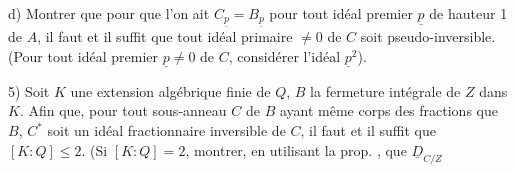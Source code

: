 d) Montrer que pour que l'on ait $C_{\underline p}=B_{\underline p}$ pour tout idéal premier $\underline p$ de hauteur 1 de $A$, il faut et il suffit que tout idéal primaire $\ne 0$ de $C$ soit pseudo-inversible. (Pour tout idéal premier $\underline p\ne0$ de $C$, considérer l'idéal $\underline p^2$).

5) Soit $K$ une extension algébrique finie de $Q$, $B$ la fermeture intégrale de $Z$ dans $K$. Afin que, pour tout sous-anneau $C$ de $B$ ayant même corps des fractions que $B$, $C^*$ soit un idéal fractionnaire inversible de $C$, il faut et il suffit que $[K:Q]\leq2$. (Si $[K:Q]=2$, montrer, en utilisant la prop. \quad, que $\underline D_{C/Z}$
